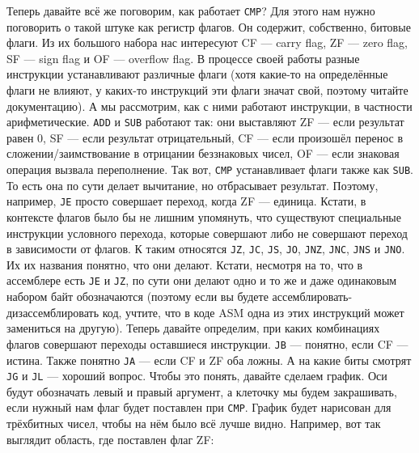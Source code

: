 \documentclass{article}
\newcommand{\asm}[1]{\texttt{#1}}
\begin{document}
    Теперь давайте всё же поговорим, как работает \asm{CMP}? Для этого нам нужно поговорить о такой штуке как регистр флагов. Он содержит, собственно, битовые флаги. Из их большого набора нас интересуют CF --- carry flag, ZF --- zero flag, SF --- sign flag и OF --- overflow flag. В процессе своей работы разные инструкции устанавливают различные флаги (хотя какие-то на определённые флаги не влияют, у каких-то инструкций эти флаги значат свой, поэтому читайте документацию). А мы рассмотрим, как с ними работают инструкции, в частности арифметические. \asm{ADD} и \asm{SUB} работают так: они выставляют ZF --- если результат равен 0, SF --- если результат отрицательный, CF --- если произошёл перенос в сложении/заимствование в отрицании беззнаковых чисел, OF --- если знаковая операция вызвала переполнение. Так вот, \asm{CMP} устанавливает флаги также как \asm{SUB}. То есть она по сути делает вычитание, но отбрасывает результат. Поэтому, например, \asm{JE} просто совершает переход, когда ZF --- единица. Кстати, в контексте флагов было бы не лишним упомянуть, что существуют специальные инструкции условного перехода, которые совершают либо не совершают переход в зависимости от флагов. К таким относятся \asm{JZ}, \asm{JC}, \asm{JS}, \asm{JO}, \asm{JNZ}, \asm{JNC}, \asm{JNS} и \asm{JNO}. Их их названия понятно, что они делают. Кстати, несмотря на то, что в ассемблере есть \asm{JE} и \asm{JZ}, по сути они делают одно и то же и даже одинаковым набором байт обозначаются (поэтому если вы будете ассемблировать-дизассемблировать код, учтите, что в коде ASM одна из этих инструкций может замениться на другую). Теперь давайте определим, при каких комбинациях флагов совершают переходы оставшиеся инструкции. \asm{JB} --- понятно, если CF --- истина. Также понятно \asm{JA} --- если CF и ZF оба ложны. А на какие биты смотрят \asm{JG} и \asm{JL} --- хороший вопрос. Чтобы это понять, давайте сделаем график. Оси будут обозначать левый и правый аргумент, а клеточку мы будем закрашивать, если нужный нам флаг будет поставлен при \asm{CMP}. График будет нарисован для трёхбитных чисел, чтобы на нём было всё лучше видно. Например, вот так выглядит область, где поставлен флаг ZF:
\end{document}
